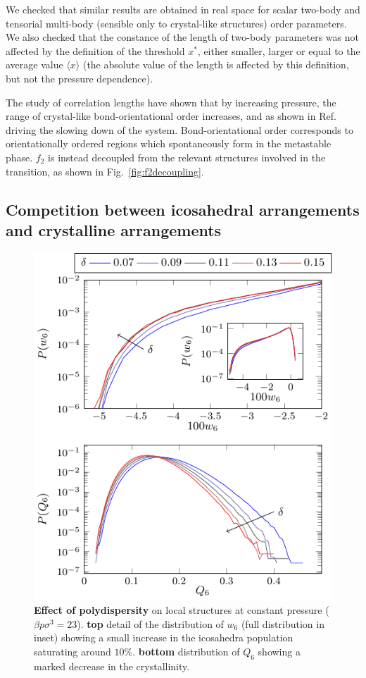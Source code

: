 \documentclass[twocolumn,superscriptaddress]{revtex4-1}
\begin{document}
We checked that similar results are obtained in real space for scalar two-body and tensorial multi-body (sensible only to crystal-like structures) order parameters. We also checked that the constance of the length of two-body parameters was not affected by the definition of the threshold $x^*$, either smaller, larger or equal to the average value $\langle x\rangle$ (the absolute value of the length is affected by this definition, but not the pressure dependence).

The study of correlation lengths have shown that by increasing pressure, the range of
crystal-like bond-orientational order increases, and as shown in Ref.~\cite{tanaka,mathieu_icosahedra}
driving the slowing down of the system. Bond-orientational order corresponds to
orientationally ordered regions which spontaneously form in the metastable phase.
$f_2$ is instead decoupled from the relevant structures involved in the transition, as
shown in Fig.~\ref{fig:f2decoupling}.





\subsection{Competition between icosahedral arrangements and crystalline arrangements}

\begin{figure}
 \centering
 \includegraphics{fig_polydistrib}
 \caption{\textbf{Effect of polydispersity} on local structures at constant pressure ($\beta p\sigma^3=23$). \textbf{top} detail of the distribution of $w_6$ (full distribution in inset) showing a small increase in the icosahedra population saturating around $10\%$. \textbf{bottom} distribution of $Q_6$ showing a marked decrease in the crystallinity.}
 \label{fig:polydispersity}
\end{figure}
\end{document}
